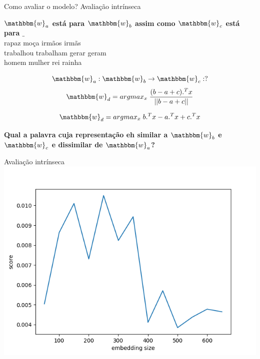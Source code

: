 \documentclass{beamer}
\newcommand{\wo}{\mathbbm{w}}
\begin{document}
\begin{frame}[fragile]{Como avaliar o modelo? Avaliação intrínseca}
\begin{center}
\textbf{$\wo_{a}$ está para $\wo_{b}$ assim como $\wo_{c}$ está para $\_$}\\
rapaz moça irmãos irmãs\\
trabalhou trabalham gerar geram\\
homem mulher rei rainha
\end{center}
\[
\wo_{a}:\wo_{b} \rightarrow \wo_{c}: ?
\]
\begin{equation}\label{eq:32}
\wo_{d} = arg max_{x} \; \frac{(b-a +c).^{T}x}{||b-a +c||}
\end{equation}

\begin{equation}\label{eq:33}
\wo_{d} = arg max_{x}  \; b.^{T}x -a.^{T}x +c.^{T}x
\end{equation}
\begin{center}
\textbf{ Qual a palavra cuja representação eh similar a $\wo_{b}$ e $\wo_{c}$ e dissimilar de $\wo_{a}$?}
\end{center}

\end{frame}

\begin{frame}[fragile]{Avaliação intrínseca}
\includegraphics[scale=0.69]{emb_size}
\end{frame}
\end{document}
